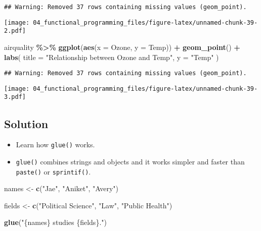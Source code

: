 \documentclass[
]{book}
\newenvironment{Shaded}{\begin{snugshade}}{\end{snugshade}}
\newcommand{\DataTypeTok}[1]{\textcolor[rgb]{0.13,0.29,0.53}{#1}}
\newcommand{\KeywordTok}[1]{\textcolor[rgb]{0.13,0.29,0.53}{\textbf{#1}}}
\newcommand{\NormalTok}[1]{#1}
\newcommand{\OperatorTok}[1]{\textcolor[rgb]{0.81,0.36,0.00}{\textbf{#1}}}
\newcommand{\StringTok}[1]{\textcolor[rgb]{0.31,0.60,0.02}{#1}}
\begin{document}
\begin{verbatim}
## Warning: Removed 37 rows containing missing values (geom_point).
\end{verbatim}

\texttt{[image: 04\_functional\_programming\_files/figure-latex/unnamed-chunk-39-2.pdf]}

\begin{Shaded}
\begin{Highlighting}[]
\NormalTok{airquality }\OperatorTok{\%\textgreater{}\%}
\StringTok{  }\KeywordTok{ggplot}\NormalTok{(}\KeywordTok{aes}\NormalTok{(}\DataTypeTok{x =}\NormalTok{ Ozone, }\DataTypeTok{y =}\NormalTok{ Temp)) }\OperatorTok{+}
\StringTok{  }\KeywordTok{geom\_point}\NormalTok{() }\OperatorTok{+}
\StringTok{  }\KeywordTok{labs}\NormalTok{(}
    \DataTypeTok{title =} \StringTok{"Relationship between Ozone and Temp"}\NormalTok{,}
    \DataTypeTok{y =} \StringTok{"Temp"}
\NormalTok{  )}
\end{Highlighting}
\end{Shaded}

\begin{verbatim}
## Warning: Removed 37 rows containing missing values (geom_point).
\end{verbatim}

\texttt{[image: 04\_functional\_programming\_files/figure-latex/unnamed-chunk-39-3.pdf]}

\hypertarget{solution}{%
\subsection{Solution}\label{solution}}

\begin{itemize}
\item
  Learn how \texttt{glue()} works.
\item
  \texttt{glue()} combines strings and objects and it works simpler and faster than \texttt{paste()} or \texttt{sprintif()}.
\end{itemize}

\begin{Shaded}
\begin{Highlighting}[]
\NormalTok{names \textless{}{-}}\StringTok{ }\KeywordTok{c}\NormalTok{(}\StringTok{"Jae"}\NormalTok{, }\StringTok{"Aniket"}\NormalTok{, }\StringTok{"Avery"}\NormalTok{)}

\NormalTok{fields \textless{}{-}}\StringTok{ }\KeywordTok{c}\NormalTok{(}\StringTok{"Political Science"}\NormalTok{, }\StringTok{"Law"}\NormalTok{, }\StringTok{"Public Health"}\NormalTok{)}

\KeywordTok{glue}\NormalTok{(}\StringTok{"\{names\} studies \{fields\}."}\NormalTok{)}
\end{Highlighting}
\end{Shaded}
\end{document}
